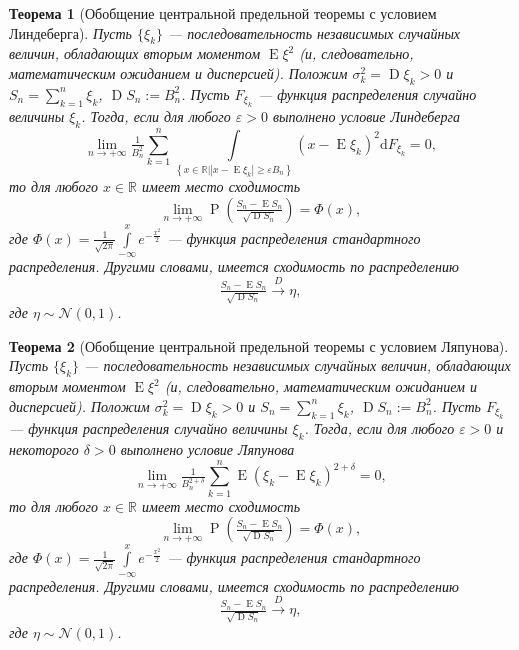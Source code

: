 \documentclass[12pt]{article}
\newtheorem{theorem}{Теорема}
\numberwithin{theorem}{section}
\theoremstyle{definition}
\newcommand{\defin}[2]{\hypertarget{#2}{{\color{red} #1}}}
\newcommand{\RR}{\mathbb{R}}
\newcommand{\prob}{\operatorname{P}}
\newcommand{\expect}{\operatorname{E}}
\newcommand{\disp}{\operatorname{D}}
\newcommand{\diff}{\mathrm{d}}
\newcommand{\defineset}[2]{\left\{
	\left.
	#1
	\right\vert
	#2
	\right\}}
\begin{document}
	\begin{theorem}[Обобщение центральной предельной теоремы с условием Линдеберга] \label{central limit theorem | Lindeberd}
		Пусть $ \{\xi_k\} $ --- последовательность независимых случайных величин,
		обладающих вторым моментом $ \expect\xi^2 $ (и, следовательно, математическим ожиданием и дисперсией).
		Положим $ \sigma_k^2 = \disp\xi_k > 0 $ и $ S_n = \sum\limits_{k = 1}^{n} \xi_k $,
		$ \disp S_n := B_n^2 $. Пусть $ F_{\xi_k} $ --- функция распределения случайно величины $ \xi_k $.
		Тогда, если для любого $ \varepsilon > 0 $ выполнено \defin{условие Линдеберга}{Lindeberg}
		$$ \lim\limits_{n \to +\infty} \tfrac{1}{B_n^2} \sum\limits_{k = 1}^{n} 
		\int\limits_{\defineset{x \in \RR}{|x - \expect\xi_k| \geqslant \varepsilon B_n}}
		(x - \expect\xi_k)^2\diff F_{\xi_k} = 0, $$
		то для любого $ x \in \RR $ имеет место сходимость
		$$ \lim\limits_{n \to +\infty} \prob(\tfrac{S_n - \expect S_n}{\sqrt{\disp S_n}}) = \Phi(x), $$
		где $ \Phi(x) = \tfrac{1}{\sqrt{2\pi}}\int\limits_{-\infty}^{x} e^{-\tfrac{x^2}{2}} $
		--- функция распределения стандартного распределения.
		Другими словами, имеется сходимость по распределению
		$$ \tfrac{S_n - \expect S_n}{\sqrt{\disp S_n}} \overset{D}{\to} \eta, $$
		где $ \eta \sim \mathcal{N}(0, 1) $.
	\end{theorem}

	\begin{theorem}[Обобщение центральной предельной теоремы с условием Ляпунова] \label{central limit theorem | Lyapunov}
		Пусть $ \{\xi_k\} $ --- последовательность независимых случайных величин,
		обладающих вторым моментом $ \expect\xi^2 $ (и, следовательно, математическим ожиданием и дисперсией).
		Положим $ \sigma_k^2 = \disp\xi_k > 0 $ и $ S_n = \sum\limits_{k = 1}^{n} \xi_k $,
		$ \disp S_n := B_n^2 $. Пусть $ F_{\xi_k} $ --- функция распределения случайно величины $ \xi_k $.
		Тогда, если для любого $ \varepsilon > 0 $ и некоторого $ \delta > 0 $ 
		выполнено \defin{условие Ляпунова}{Lyapunov}
		$$ \lim\limits_{n \to +\infty} \tfrac{1}{B_n^{2 + \delta}} 
		\sum\limits_{k = 1}^{n} \expect (\xi_k - \expect\xi_k)^{2 + \delta} = 0, $$
		то для любого $ x \in \RR $ имеет место сходимость
		$$ \lim\limits_{n \to +\infty} \prob(\tfrac{S_n - \expect S_n}{\sqrt{\disp S_n}}) = \Phi(x), $$
		где $ \Phi(x) = \tfrac{1}{\sqrt{2\pi}}\int\limits_{-\infty}^{x} e^{-\tfrac{x^2}{2}} $
		--- функция распределения стандартного распределения.
		Другими словами, имеется сходимость по распределению
		$$ \tfrac{S_n - \expect S_n}{\sqrt{\disp S_n}} \overset{D}{\to} \eta, $$
		где $ \eta \sim \mathcal{N}(0, 1) $.
	\end{theorem}
	
\end{document}
